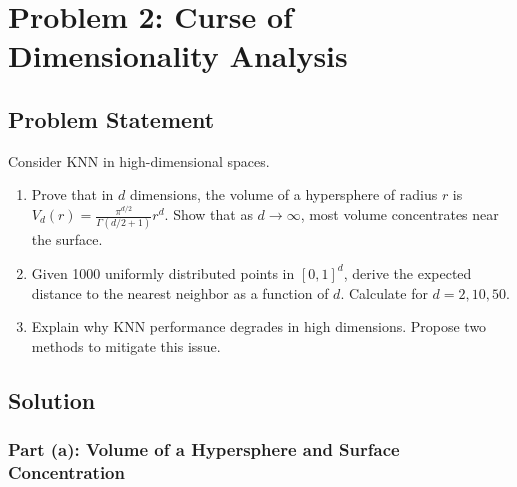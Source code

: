 \documentclass[12pt]{article}
\begin{document}
\newpage
\section{Problem 2: Curse of Dimensionality Analysis}

\subsection{Problem Statement}

Consider KNN in high-dimensional spaces.

\begin{enumerate}
\item[(a)] Prove that in \(d\) dimensions, the volume of a hypersphere of radius \(r\) is \(V_d(r) = \frac{\pi^{d/2}}{\Gamma(d/2 + 1)}r^d\). Show that as \(d \to \infty\), most volume concentrates near the surface.
\item[(b)] Given 1000 uniformly distributed points in \([0,1]^d\), derive the expected distance to the nearest neighbor as a function of \(d\). Calculate for \(d = 2, 10, 50\).
\item[(c)] Explain why KNN performance degrades in high dimensions. Propose two methods to mitigate this issue.
\end{enumerate}

\subsection{Solution}

\subsubsection{Part (a): Volume of a Hypersphere and Surface Concentration}
\end{document}

